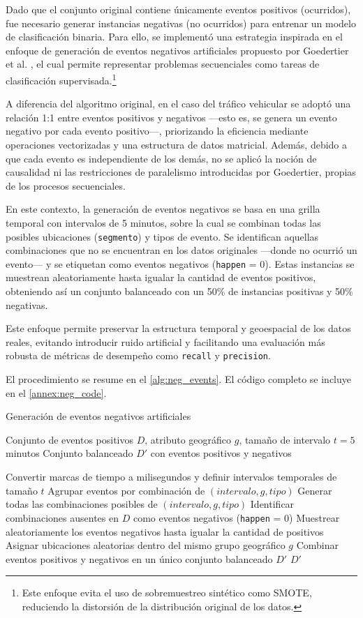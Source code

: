\documentclass[12pt]{article}
\begin{document}
Dado que el conjunto original contiene únicamente eventos positivos (ocurridos), fue necesario generar instancias negativas (no ocurridos) para entrenar un modelo de clasificación binaria. Para ello, se implementó una estrategia inspirada en el enfoque de generación de eventos negativos artificiales propuesto por Goedertier et al. \parencite{goedertier2009robust}, el cual permite representar problemas secuenciales como tareas de clasificación supervisada.\footnote{Este enfoque evita el uso de sobremuestreo sintético como SMOTE, reduciendo la distorsión de la distribución original de los datos.}

A diferencia del algoritmo original, en el caso del tráfico vehicular se adoptó una relación 1:1 entre eventos positivos y negativos —esto es, se genera un evento negativo por cada evento positivo—, priorizando la eficiencia mediante operaciones vectorizadas y una estructura de datos matricial. Además, debido a que cada evento es independiente de los demás, no se aplicó la noción de causalidad ni las restricciones de paralelismo introducidas por Goedertier, propias de los procesos secuenciales.

En este contexto, la generación de eventos negativos se basa en una grilla temporal con intervalos de 5 minutos, sobre la cual se combinan todas las posibles ubicaciones (\texttt{segmento}) y tipos de evento. Se identifican aquellas combinaciones que no se encuentran en los datos originales —donde no ocurrió un evento— y se etiquetan como eventos negativos (\texttt{happen} = 0). Estas instancias se muestrean aleatoriamente hasta igualar la cantidad de eventos positivos, obteniendo así un conjunto balanceado con un 50\% de instancias positivas y 50\% negativas.

Este enfoque permite preservar la estructura temporal y geoespacial de los datos reales, evitando introducir ruido artificial y facilitando una evaluación más robusta de métricas de desempeño como \texttt{recall} y \texttt{precision}.

El procedimiento se resume en el \autoref{alg:neg_events}. El código completo se incluye en el \autoref{annex:neg_code}.

\begin{algorithm}[H]
\caption{Generación de eventos negativos artificiales}
\label{alg:neg_events}
\begin{algorithmic}[1]
\Require Conjunto de eventos positivos $D$, atributo geográfico $g$, tamaño de intervalo $t = 5$ minutos
\Ensure Conjunto balanceado $D'$ con eventos positivos y negativos

\State Convertir marcas de tiempo a milisegundos y definir intervalos temporales de tamaño $t$
\State Agrupar eventos por combinación de $(intervalo, g, tipo)$
\State Generar todas las combinaciones posibles de $(intervalo, g, tipo)$
\State Identificar combinaciones ausentes en $D$ como eventos negativos (\texttt{happen} = 0)
\State Muestrear aleatoriamente los eventos negativos hasta igualar la cantidad de positivos
\State Asignar ubicaciones aleatorias dentro del mismo grupo geográfico $g$
\State Combinar eventos positivos y negativos en un único conjunto balanceado $D'$
\State \Return $D'$
\end{algorithmic}
\end{algorithm}
\end{document}
